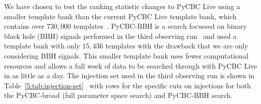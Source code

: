 We have chosen to test the ranking statistic changes to PyCBC Live using a smaller template bank than the current PyCBC Live template bank, which contains over $730,000$ templates~\cite{PyCBC_Live:2018}. PyCBC-BBH is a search focussed on binary black hole (BBH) signals performed in the third observing run~\cite{gwtc3:2023, PyCBC_focussed_bbh:2024} and used a template bank with only $15,436$ templates with the drawback that we are only considering BBH signals. This smaller template bank uses fewer computational resources and allows a full week of data to be searched through with PyCBC Live in as little as a day. The injection set used in the third observing run is shown in Table~\ref{5:tab:injection-set}~\cite{gwtc3:2023} with rows for the specific cuts on injections for both the PyCBC-broad (full parameter space search) and PyCBC-BBH search.
